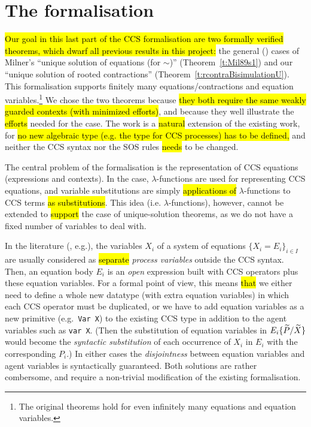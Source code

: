 
\section{The \multivariate formalisation}
\label{sec:multivariate}

\hl{Our goal in this last part of the CCS formalisation are two formally
verified theorems, which dwarf all previous results in this project:}
the general (\multivariate) cases of
Milner's ``unique solution of equations (for $\sim$)''
(Theorem~\ref{t:Mil89s1}) and our ``unique solution of rooted
contractions'' (Theorem~\ref{t:rcontraBisimulationU}).
%
This formalisation supports finitely many
  equations/contractions and equation variables.\footnote{The original theorems
hold for even infinitely many equations and equation variables.}
We chose the two theorems because \hl{they both require the same
weakly guarded contexts (with minimized efforts)}, and 
because they well illustrate the \hl{efforts} needed for the \multivariate case.
The work is a \hl{natural} extension of the existing work, for
\hl{no new algebraic type (e.g. the type for CCS processes) has to be defined,}
and neither the CCS syntax nor the SOS rules \hl{needs} to be changed.

The central problem of the \multivariate formalisation is the
representation of \multivariate CCS equations (expressions and contexts).
In the \univariate case, $\lambda$-functions
are used for representing \univariate CCS
equations, and variable substitutions are simply 
\hl{applications of} $\lambda$-functions to CCS terms \hl{as substitutions}.
This idea (i.e. \multivariate $\lambda$-functions), however,
cannot be extended to \hl{support} the \multivariate case of
unique-solution theorems, as we do not have a fixed number of variables to deal with.

In the literature (\citep[p.~102]{Gorrieri:2015jt}, e.g.), the variables $X_i$ of
a system of equations $\{X_i = E_i\}_{i\in I}$ are usually considered as
\hl{separate} \emph{process variables} outside the CCS syntax.
Then, an equation body  $E_i$  is an \emph{open} expression
built with CCS operators plus these equation variables.
For a formal point of view, this means \hl{that} we either need to define a
whole new datatype (with extra equation variables) in which each CCS
operator must be duplicated, or we have to add equation variables as a
new primitive (e.g.~\texttt{Var X}) to the existing CCS type in addition
to the agent variables such as \texttt{var X}.
(Then the substitution of equation
variables in $E_i\{\widetilde P/\widetilde X\}$ would become the \emph{syntactic substitution} of
each occurrence of $X_i$ in $E_i$ with the corresponding $P_i$.)
In either cases the \emph{disjointness} between equation variables and
agent variables is syntactically
guaranteed. Both solutions are rather combersome, and require a non-trivial modification
of the existing \univariate formalisation.

